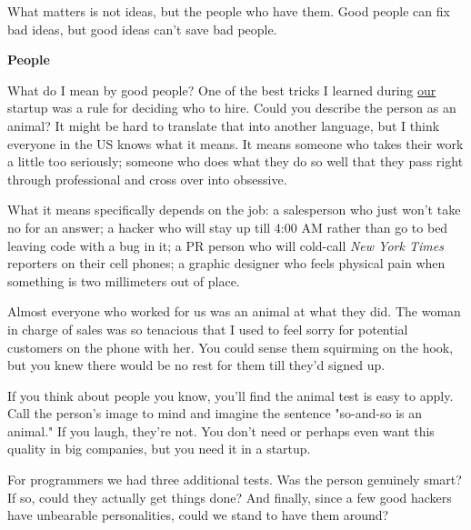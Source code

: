 What matters is not ideas, but
                    the people who have them. Good people can fix bad ideas, but
                    good ideas can't save bad people.
                    

\textbf{People}

What do I mean by good people? One of the best
                    tricks I learned during \href{http://www.paulgraham.com/road.html}{our} startup
                    was a rule for deciding who to hire. Could you describe the
                    person as an animal? It might be hard to translate that into
                    another language, but I think everyone in the US knows what
                    it means. It means someone who takes their work a little too
                    seriously; someone who does what they do so well that they
                    pass right through professional and cross over into
                    obsessive.

What it means specifically depends on
                    the job: a salesperson who just won't take no for an answer;
                    a hacker who will stay up till 4:00 AM rather than go to bed
                    leaving code with a bug in it; a PR person who will
                    cold-call \emph{New York Times} reporters on their cell
                    phones; a graphic designer who feels physical pain when
                    something is two millimeters out of place.

Almost
                    everyone who worked for us was an animal at what they did.
                    The woman in charge of sales was so tenacious that I used to
                    feel sorry for potential customers on the phone with her.
                    You could sense them squirming on the hook, but you knew
                    there would be no rest for them till they'd signed up.

If
                    you think about people you know, you'll find the animal test
                    is easy to apply. Call the person's image to mind and
                    imagine the sentence "so-and-so is an animal." If you laugh,
                    they're not. You don't need or perhaps even want this
                    quality in big companies, but you need it in a startup.

For
                    programmers we had three additional tests. Was the person
                    genuinely smart? If so, could they actually get things done?
                    And finally, since a few good hackers have unbearable
                    personalities, could we stand to have them around?

